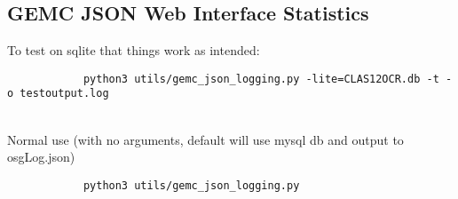     \subsection*{GEMC JSON Web Interface Statistics}
         To test on sqlite that things work as intended: 
         \begin{lstlisting}
            python3 utils/gemc_json_logging.py -lite=CLAS12OCR.db -t -o testoutput.log
        \end{lstlisting}
        ~\\
        \newline
        Normal use (with no arguments, default will use mysql db and output to osgLog.json)
        \begin{lstlisting}
            python3 utils/gemc_json_logging.py 
        \end{lstlisting}



